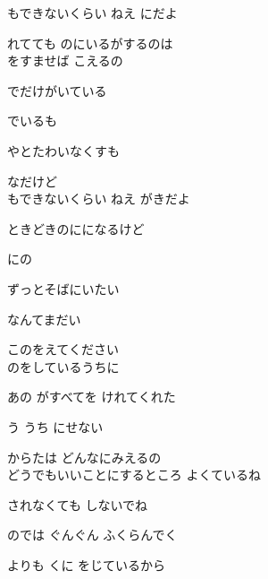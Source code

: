 \large{

もできないくらい ねえ にだよ

れてても のにいるがするのは
\\

をすませば こえるの

でだけがいている

でいるも

やとたわいなくすも

なだけど
\\

もできないくらい ねえ がきだよ

ときどきのにになるけど

にの 

ずっとそばにいたい

なんてまだい 

このをえてください
\\

のをしているうちに

あの がすべてを けれてくれた

う うち にせない

からたは どんなにみえるの
\\

どうでもいいことにするところ よくているね

されなくても  しないでね

のでは ぐんぐん ふくらんでく

よりも くに をじているから
\\

}
